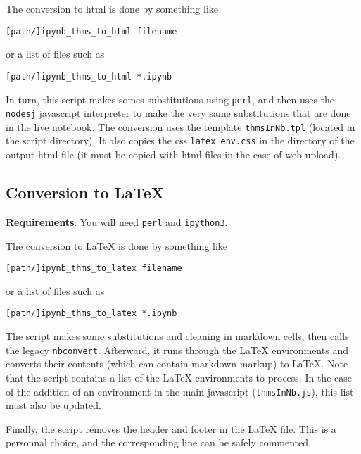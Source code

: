 The conversion to html is done by something like

\begin{verbatim}
[path/]ipynb_thms_to_html filename
\end{verbatim}

or a list of files such as

\begin{verbatim}
[path/]ipynb_thms_to_html *.ipynb
\end{verbatim}

In turn, this script makes somes substitutions using \texttt{perl}, and
then uses the \texttt{nodesj} javascript interpreter to make the very
same substitutions that are done in the live notebook. The conversion
uses the template \texttt{thmsInNb.tpl} (located in the script
directory). It also copies the css \texttt{latex\_env.css} in the
directory of the output html file (it must be copied with html files in
the case of web upload).

    \subsection{Conversion to LaTeX}\label{conversion-to-latex}

    \textbf{Requirements}: You will need \texttt{perl} and
\texttt{ipython3}.

The conversion to LaTeX is done by something like

\begin{verbatim}
[path/]ipynb_thms_to_latex filename
\end{verbatim}

or a list of files such as

\begin{verbatim}
[path/]ipynb_thms_to_latex *.ipynb

\end{verbatim}

The script makes some substitutions and cleaning in markdown cells, then
calls the legacy \texttt{nbconvert}. Afterward, it runs through the
LaTeX environments and converts their contents (which can contain
markdown markup) to LaTeX. Note that the script contains a list of the
LaTeX environments to process. In the case of the addition of an
environment in the main javascript (\texttt{thmsInNb.js}), this list
must also be updated.

Finally, the script removes the header and footer in the LaTeX file.
This is a personnal choice, and the corresponding line can be safely
commented.

